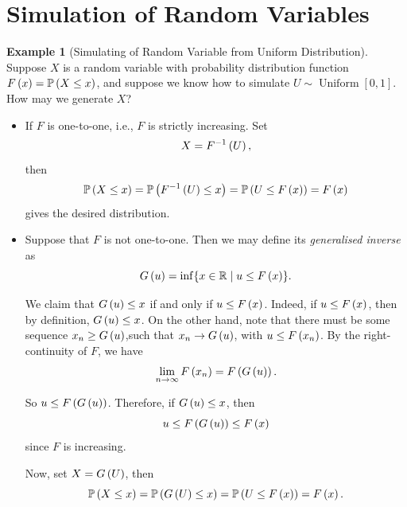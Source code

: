 \documentclass{article}
\theoremstyle{definition}
\newtheorem{example}[theorem]{Example}
\theoremstyle{remark}
\newcommand{\RR}{\mathbb{R}}
\newcommand{\Prob}{\mathbb{P}}
\newcommand{\inverse}{^{-1}}
\newcommand{\ccintv}[2]{[#1,#2]}
\newcommand{\set}[2]{\{#1\mid #2\}}
\newcommand{\Uniform}{\operatorname{Uniform}}
\begin{document}
\section{Simulation of Random Variables}

\begin{example}[Simulating of Random Variable from Uniform Distribution]
    \label{ex:simulation-from-uniform}%
    Suppose \(X\) is a random variable with probability distribution function \(F\pqty{x} = \Prob\pqty{X \leq x}\), and suppose we know how to simulate \(U \sim \Uniform \ccintv{0}{1}\). How may we generate \(X\)?

    \begin{itemize}
        \item If \(F\) is one-to-one, i.e., \(F\) is strictly increasing. Set
        \[
            X = F\inverse\pqty{U},
        \]
        then
        \[
            \Prob\pqty{X \leq x} = \Prob\pqty{F\inverse\pqty{U} \leq x} = \Prob\pqty{U \leq F\pqty{x}} = F\pqty{x}
        \]
        gives the desired distribution.

        \item Suppose that \(F\) is not one-to-one. Then we may define its \emph{generalised inverse} as
        \[
            G\pqty{u} = \inf \set{x \in \RR}{u \leq F\pqty{x}}.
        \]

        We claim that \(G\left(u\right) \leq x\) if and only if \(u \leq F\left(x\right)\). Indeed, if \(u \leq F\left(x\right)\), then by definition, \(G\left(u\right) \leq x\). On the other hand, note that there must be some sequence \(x_n \geq G\left(u\right)\),such that \(x_n \to G\left(u\right)\), with \(u \leq F\left(x_n\right)\). By the right-continuity of \(F\), we have
        \[
            \lim_{n \to \infty} F\left(x_n\right) = F\left(G\left(u\right)\right).
        \]

        So \(u \leq F\left(G\left(u\right)\right)\). Therefore, if \(G\left(u\right) \leq x\), then
        \[
            u \leq F\left(G\left(u\right)\right) \leq F\left(x\right)
        \]
        since \(F\) is increasing.

        Now, set \(X = G\left(U\right)\), then
        \[
            \Prob\pqty{X \leq x} = \Prob\pqty{G\pqty{U} \leq x} = \Prob\pqty{U \leq F\pqty{x}} = F\pqty{x}.
        \]
    \end{itemize} 
\end{example}
\end{document}
